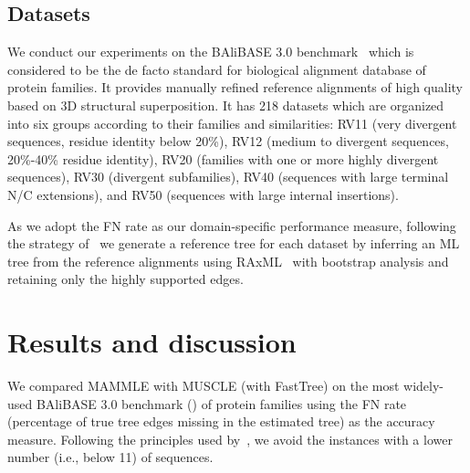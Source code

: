 \subsection{Datasets}
We conduct our experiments on the BAliBASE 3.0 benchmark~\cite{thompson2005balibase} which is considered to be the de facto standard for biological alignment database of protein families. It provides manually refined reference alignments of high quality based on 3D structural superposition. It has 218 datasets which are organized into six groups according to their families and similarities: RV11 (very divergent sequences, residue identity below 20\%), RV12 (medium to divergent sequences, 20\%-40\% residue identity), RV20 (families with one or more highly divergent sequences), RV30 (divergent subfamilies), RV40 (sequences with large terminal N/C extensions), and RV50 (sequences with large internal insertions). 

As we adopt the FN rate as our domain-specific performance measure, following the strategy of~\cite{mirarab2015pasta} we generate a reference tree for each dataset by inferring an ML tree from the reference alignments using RAxML~\cite{stamatakis2014raxml} with bootstrap analysis and retaining only the highly supported edges.



\section{Results and discussion }
We compared MAMMLE with MUSCLE (with FastTree) on the most widely-used BAliBASE 3.0 benchmark (\cite{thompson2005balibase}) of protein families using the FN rate (percentage of true tree edges missing in the estimated tree) as the accuracy measure. Following the principles used by~\cite{mirarab2015pasta}, we avoid the instances with a lower number (i.e., below 11) of sequences. %

